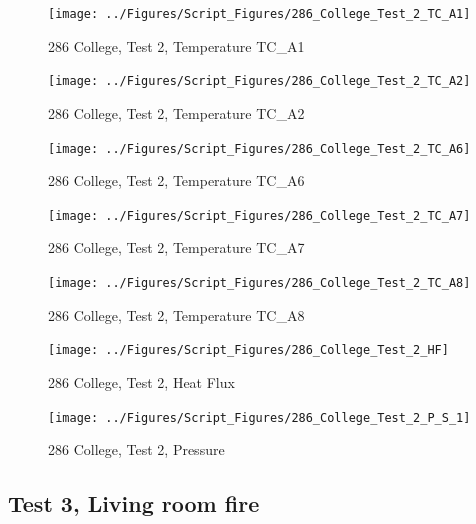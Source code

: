 \documentclass[12pt,oneside]{book}
\begin{document}
\begin{figure}[!ht]
\texttt{[image: ../Figures/Script\_Figures/286\_College\_Test\_2\_TC\_A1]}
\caption{286 College, Test 2, Temperature TC\_A1}
\label{fig:286_College_Test_2_TC_A1}
\end{figure}

\begin{figure}[!ht]
\texttt{[image: ../Figures/Script\_Figures/286\_College\_Test\_2\_TC\_A2]}
\caption{286 College, Test 2, Temperature TC\_A2}
\label{fig:286_College_Test_2_TC_A2}
\end{figure}

\begin{figure}[!ht]
\texttt{[image: ../Figures/Script\_Figures/286\_College\_Test\_2\_TC\_A6]}
\caption{286 College, Test 2, Temperature TC\_A6}
\label{fig:286_College_Test_2_TC_A6}
\end{figure}

\begin{figure}[!ht]
\texttt{[image: ../Figures/Script\_Figures/286\_College\_Test\_2\_TC\_A7]}
\caption{286 College, Test 2, Temperature TC\_A7}
\label{fig:286_College_Test_2_TC_A7}
\end{figure}

\begin{figure}[!ht]
\texttt{[image: ../Figures/Script\_Figures/286\_College\_Test\_2\_TC\_A8]}
\caption{286 College, Test 2, Temperature TC\_A8}
\label{fig:286_College_Test_2_TC_A8}
\end{figure}

\begin{figure}[!ht]
\texttt{[image: ../Figures/Script\_Figures/286\_College\_Test\_2\_HF]}
\caption{286 College, Test 2, Heat Flux}
\label{fig:286_College_Test_2_HF}
\end{figure}

\begin{figure}[!ht]
\texttt{[image: ../Figures/Script\_Figures/286\_College\_Test\_2\_P\_S\_1]}
\caption{286 College, Test 2, Pressure}
\label{fig:286_College_Test_2_P_S_1}
\end{figure}


\clearpage


\subsection{Test 3, Living room fire}
\end{document}

